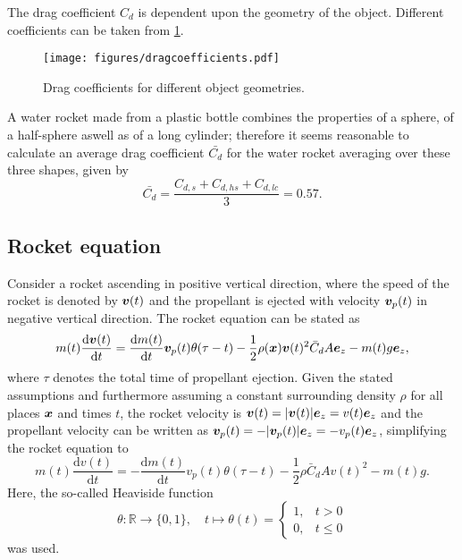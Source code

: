 \documentclass[a4paper,11pt]{report}
\begin{document}
The drag coefficient $C_d$ is dependent upon the geometry of the object. Different coefficients can be taken from \cref{fig:dragcoefficients}.
\begin{figure}[h!]
\centering
\texttt{[image: figures/dragcoefficients.pdf]}
\caption{Drag coefficients for different object geometries.}
\label{fig:dragcoefficients}
\end{figure} A water rocket made from a plastic bottle combines the properties of a sphere, of a half-sphere aswell as of a long cylinder; therefore it seems reasonable to calculate an average drag coefficient $\bar{C_{d}}$ for the water rocket averaging over these three shapes, given by \begin{equation}\label{eq:avdragvalue}
\bar{C_{d}} = \frac{C_{d,s}+C_{d,hs}+C_{d,lc}}{3} = 0.57.
\end{equation}

\subsection{Rocket equation}
Consider a rocket ascending in positive vertical direction, where the speed of the rocket is denoted by $\bm{v}(t)$ and the propellant is ejected with velocity $\bm{v}_p(t)$ in negative vertical direction. The rocket equation can be stated as \begin{equation}
m(t)\frac{\mathrm{d}\bm{v}(t)}{\mathrm{d}t} = \frac{\mathrm{d}m(t)}{\mathrm{d}t}\bm{v}_p(t)\theta(\tau-t) - \frac{1}{2}\rho(\bm{x})\bm{v}(t)^2\bar{C}_dA\bm{e}_z - m(t)g\bm{e}_z, 
\end{equation} where $\tau$ denotes the total time of propellant ejection. Given the stated assumptions and furthermore assuming a constant surrounding density $\rho$ for all places $\bm{x}$ and times $t$, the rocket velocity is $\bm{v}(t) = |\bm{v}(t)|\bm{e}_z = v(t)\bm{e}_z$ and the propellant velocity can be written as $\bm{v}_p(t) = -|\bm{v}_p(t)|\bm{e}_z = -v_p(t)\bm{e}_z$, simplifying the rocket equation to \begin{equation}\label{eq:rocketeqsimple}
m(t)\frac{\mathrm{d}v(t)}{\mathrm{d}t} = -\frac{\mathrm{d}m(t)}{\mathrm{d}t}v_p(t)\theta(\tau-t) - \frac{1}{2}\rho \bar{C}_d A v(t)^2 - m(t) g.
\end{equation} Here, the so-called Heaviside function
\begin{equation}\label{eq:defheaviside}
\theta: \mathbb{R} \rightarrow \{0,1\}, \quad t \mapsto \theta(t) = \begin{cases}
1, & t > 0 \\
0, & t \leq 0
\end{cases}
\end{equation} was used.
\end{document}
